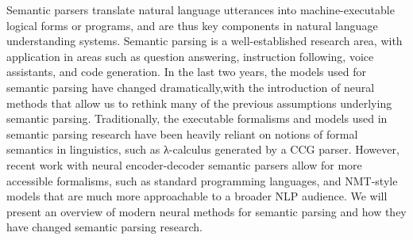 Semantic parsers translate natural language utterances        into machine-executable  logical  forms  or programs,  and  are  thus  key components  in        natural language  understanding  systems.   Semantic parsing is  a  well-established  research area, with application  in  areas  such  as question  answering, instruction  following, voice assistants, and code generation.  In the last two years, the models used for semantic  parsing have changed  dramatically,with the introduction of neural methods that allow us to rethink many of the previous assumptions underlying semantic parsing. Traditionally,        the  executable  formalisms  and models  used  in  semantic parsing  research  have been heavily reliant on notions of formal semantics in linguistics, such as λ-calculus generated by a CCG parser.  However, recent work with neural encoder-decoder semantic parsers allow for more accessible formalisms, such as standard programming  languages,  and  NMT-style  models that  are much        more  approachable  to        a  broader  NLP  audience.   We will present an overview of modern neural methods for semantic parsing and how they have changed semantic parsing research.
